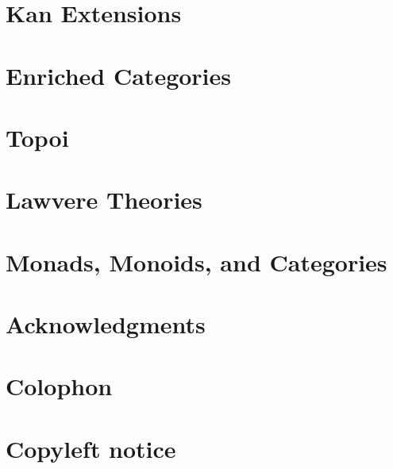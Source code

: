 \chapter{Kan Extensions}\label{kan-extensions}


\chapter{Enriched Categories}\label{enriched-categories}


\chapter{Topoi}\label{topoi}


\chapter{Lawvere Theories}\label{lawvere-theories}


\chapter{Monads, Monoids, and Categories}\label{monads-monoids-categories}


\backmatter


\chapter*{Acknowledgments}\label{acknowledgments}


\chapter*{Colophon}\label{colophon}


\chapter*{Copyleft notice} %


